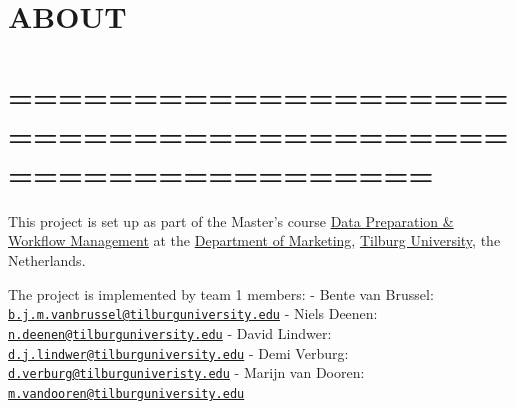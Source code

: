\documentclass[
]{article}
\begin{document}
\section{ABOUT}\label{about}

\section{=========================================================}\label{section-21}

This project is set up as part of the Master's course
\href{https://dprep.hannesdatta.com/}{Data Preparation \& Workflow
Management} at the
\href{https://www.tilburguniversity.edu/about/schools/economics-and-management/organization/departments/marketing}{Department
of Marketing}, \href{https://www.tilburguniversity.edu/}{Tilburg
University}, the Netherlands.

The project is implemented by team 1 members: - Bente van Brussel:
\href{mailto:b.j.m.vanbrussel@tilburguniversity.edu}{\nolinkurl{b.j.m.vanbrussel@tilburguniversity.edu}}
- Niels Deenen:
\href{mailto:n.deenen@tilburguniversity.edu}{\nolinkurl{n.deenen@tilburguniversity.edu}}
- David Lindwer:
\href{mailto:d.j.lindwer@tilburguniversity.edu}{\nolinkurl{d.j.lindwer@tilburguniversity.edu}}
- Demi Verburg:
\href{mailto:d.verburg@tilburguniveristy.edu}{\nolinkurl{d.verburg@tilburguniveristy.edu}}
- Marijn van Dooren:
\href{mailto:m.vandooren@tilburguniversity.edu}{\nolinkurl{m.vandooren@tilburguniversity.edu}}
\end{document}
